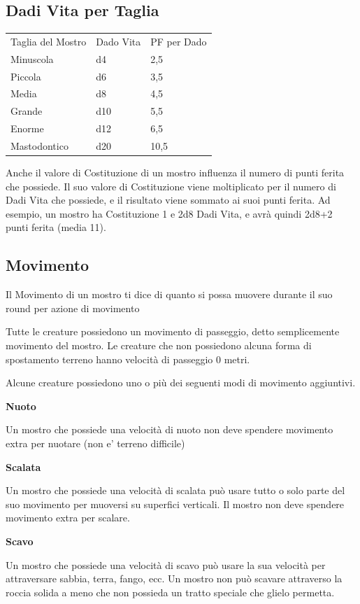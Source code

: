 \begin{multicols}{2}
\subsection{Dadi Vita per Taglia}

\medskip
\begin{tabular}{lll}
\toprule
Taglia del Mostro & Dado Vita & PF per Dado\\
Minuscola &d4&2,5\\
Piccola &d6&3,5\\
Media&d8 &4,5\\
Grande&d10&5,5\\
Enorme&d12&6,5\\
Mastodontico&d20&10,5\\
\end{tabular}
\medskip

Anche il valore di Costituzione di un mostro influenza il numero di punti ferita che possiede. Il suo valore di Costituzione viene moltiplicato per il numero di Dadi Vita che possiede, e il risultato viene sommato ai suoi punti ferita. Ad esempio, un mostro ha Costituzione 1 e 2d8 Dadi Vita, e avrà quindi 2d8+2 punti ferita (media 11).

\subsection{Movimento}

Il Movimento di un mostro ti dice di quanto si possa muovere durante il suo round per azione di movimento

Tutte le creature possiedono un movimento di passeggio, detto semplicemente movimento del mostro. Le creature che non possiedono alcuna forma di spostamento terreno hanno velocità di passeggio 0 metri.

Alcune creature possiedono uno o più dei seguenti modi di movimento aggiuntivi.

\medskip\textbf{Nuoto}

Un mostro che possiede una velocità di nuoto non deve spendere movimento extra per nuotare (non e' terreno difficile)

\medskip\textbf{Scalata}

Un mostro che possiede una velocità di scalata può usare tutto o solo parte del suo movimento per muoversi su superfici verticali. Il mostro non deve spendere movimento extra per scalare.

\medskip\textbf{Scavo}

Un mostro che possiede una velocità di scavo può usare la sua velocità per attraversare sabbia, terra, fango, ecc. Un mostro non può scavare attraverso la roccia solida a meno che non possieda un tratto speciale che glielo permetta.


\end{multicols}
